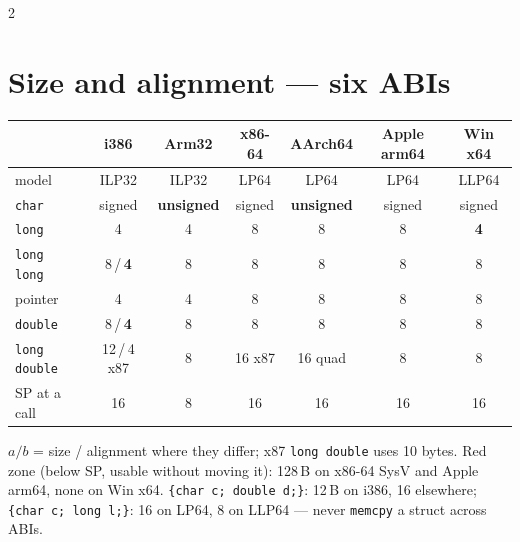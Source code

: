 \documentclass[8pt]{extarticle}
\newcommand\ct[1]{\texttt{#1}}
\begin{document}
\begin{multicols}{2}
\section{Size and alignment — six ABIs}
{\scriptsize\setlength{\tabcolsep}{1.6pt}
\begin{tabular}{@{}lcccccc@{}}
\toprule
 & \textbf{i386} & \textbf{Arm32} & \textbf{x86-64} & \textbf{AArch64} & \textbf{Apple arm64} & \textbf{Win x64}\\
\midrule
model & ILP32 & ILP32 & LP64 & LP64 & LP64 & LLP64\\
\ct{char} & signed & \textbf{unsigned} & signed & \textbf{unsigned} & signed & signed\\
\ct{long} & 4 & 4 & 8 & 8 & 8 & \textbf{4}\\
\ct{long long} & 8\,/\,\textbf{4} & 8 & 8 & 8 & 8 & 8\\
pointer & 4 & 4 & 8 & 8 & 8 & 8\\
\ct{double} & 8\,/\,\textbf{4} & 8 & 8 & 8 & 8 & 8\\
\ct{long double} & 12\,/\,4 x87 & 8 & 16 x87 & 16 quad & 8 & 8\\
SP at a call & 16 & 8 & 16 & 16 & 16 & 16\\
\bottomrule
\end{tabular}}\par
$a / b$ = size / alignment where they differ; x87 \ct{long double} uses 10 bytes. Red zone
(below SP, usable without moving it): 128\,B on x86-64 SysV and Apple arm64, none on Win x64.
\ct{\{char c; double d;\}}: 12\,B on i386, 16 elsewhere; \ct{\{char c; long l;\}}: 16 on LP64,
8 on LLP64 — never \ct{memcpy} a struct across ABIs.


\end{multicols}
\end{document}
